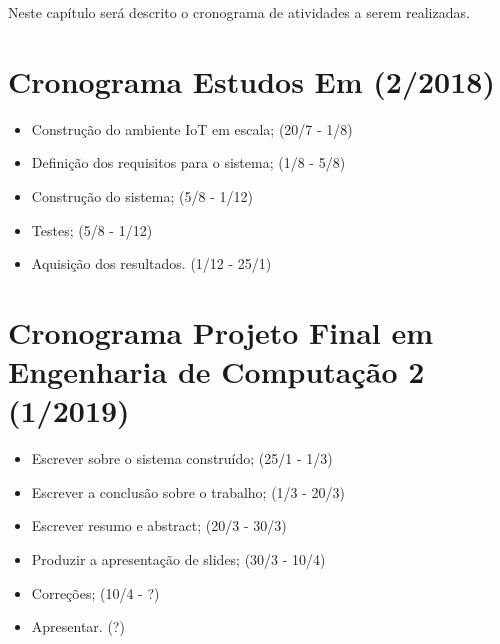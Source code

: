 Neste capítulo será descrito o cronograma de atividades a serem realizadas.

\section{Cronograma Estudos Em (2/2018)}
\begin{itemize}
  \item Construção do ambiente \acrshort{IoT} em escala; (20/7 - 1/8)
  \item Definição dos requisitos para o sistema; (1/8 - 5/8)
  \item Construção do sistema; (5/8 - 1/12)
  \item Testes; (5/8 - 1/12)
  \item Aquisição dos resultados. (1/12 - 25/1)
\end{itemize}

\section{Cronograma Projeto Final em Engenharia de Computação 2 (1/2019)}
\begin{itemize}
  \item Escrever sobre o sistema construído; (25/1 - 1/3)
  \item Escrever a conclusão sobre o trabalho; (1/3 - 20/3)
  \item Escrever resumo e abstract; (20/3 - 30/3)
  \item Produzir a apresentação de slides; (30/3 - 10/4)
  \item Correções; (10/4 - ?)
  \item Apresentar. (?)
\end{itemize}
